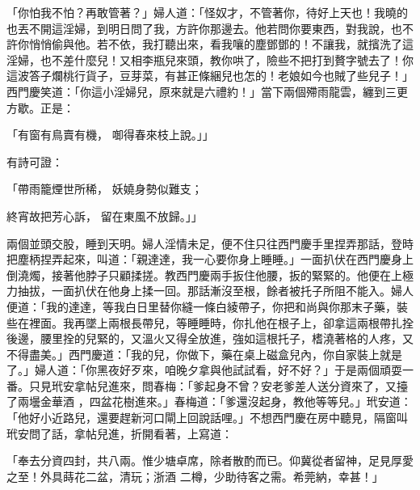 「你怕我不怕？再敢管著？」婦人道：「怪奴才，不管著你，待好上天也！我曉的也丟不開這淫婦，到明日問了我，方許你那邊去。他若問你要東西，對我說，也不許你悄悄偷與他。若不依，我打聽出來，看我嚷的塵鄧鄧的！不讓我，就擯洗了這淫婦，也不差什麼兒！又相李瓶兒來頭，教你哄了，險些不把打到贅字號去了！你這波答子爛桃行貨子，豆芽菜，有甚正條綑兒也怎的！老娘如今也賊了些兒子！」西門慶笑道：「你這小淫婦兒，原來就是六禮約！」當下兩個殢雨龍雲，纏到三更方歇。正是：

「有窗有鳥賣有機，  啣得春來枝上說。」」

有詩可證：

「帶雨籠煙世所稀，  妖嬈身勢似難支；

終宵故把芳心訴，  留在東風不放歸。」」

兩個並頭交股，睡到天明。婦人淫情未足，便不住只往西門慶手里捏弄那話，登時把塵柄捏弄起來，叫道：「親達達，我一心要你身上睡睡。」一面扒伏在西門慶身上倒澆燭，接著他脖子只顧揉搓。教西門慶兩手扳住他腰，扳的緊緊的。他便在上極力抽拔，一面扒伏在他身上揉一回。那話漸沒至根，餘者被托子所阻不能入。婦人便道：「我的達達，等我白日里替你縫一條白綾帶子，你把和尚與你那末子藥，裝些在裡面。我再墜上兩根長帶兒，等睡睡時，你扎他在根子上，卻拿這兩根帶扎拴後邊，腰里拴的兒緊的，又溫火又得全放進，強如這根托子，榰澆著格的人疼，又不得盡美。」西門慶道：「我的兒，你做下，藥在桌上磁盒兒內，你自家裝上就是了。」婦人道：「你黑夜好歹來，咱晚夕拿與他試試看，好不好？」于是兩個頑耍一番。只見玳安拿帖兒進來，問春梅：「爹起身不曾？安老爹差人送分資來了，又擡了兩壜金華酒 ，四盆花樹進來。」春梅道：「爹還沒起身，教他等等兒。」玳安道：「他好小近路兒，還要趕新河口閘上回說話哩。」不想西門慶在房中聽見，隔窗叫玳安問了話，拿帖兒進，折開看著，上寫道：

「奉去分資四封，共八兩。惟少塘卓席，除者散酌而已。仰冀從者留神，足見厚愛之至！外具蒔花二盆，清玩；浙酒 二樽，少助待客之需。希莞納，幸甚！」

